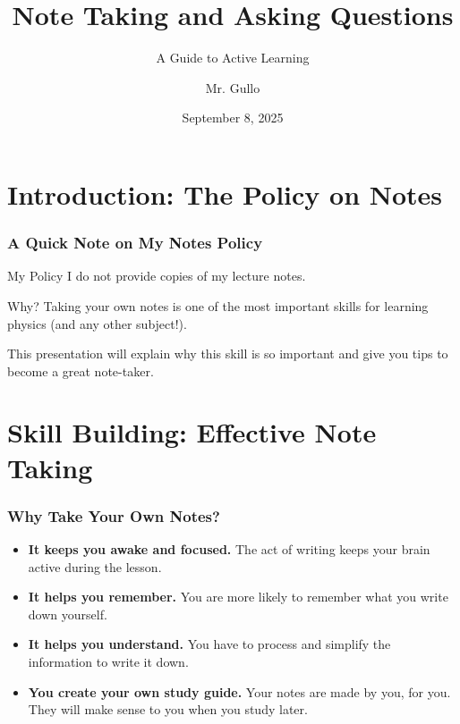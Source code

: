 \documentclass{beamer}
\title[Note Taking]{Note Taking and Asking Questions}
\subtitle{A Guide to Active Learning}
\author[Mr. Gullo]{Mr. Gullo}
\date[Sep 8, 2025]{September 8, 2025}
\begin{document}
\frame{\titlepage}

\section{Introduction: The Policy on Notes}

\begin{frame}
\frametitle{A Quick Note on My Notes Policy}
\begin{block}{My Policy}
    I do not provide copies of my lecture notes.
\end{block}

\begin{block}{Why?}
    Taking your own notes is one of the most important skills for learning physics (and any other subject!).
    \vspace{1cm}

    This presentation will explain why this skill is so important and give you tips to become a great note-taker.
\end{block}
\end{frame}

\section{Skill Building: Effective Note Taking}

\begin{frame}
\frametitle{Why Take Your Own Notes?}
\begin{itemize}
    \item \textbf{It keeps you awake and focused.} The act of writing keeps your brain active during the lesson.
    \pause
    \item \textbf{It helps you remember.} You are more likely to remember what you write down yourself.
    \pause
    \item \textbf{It helps you understand.} You have to process and simplify the information to write it down.
    \pause
    \item \textbf{You create your own study guide.} Your notes are made by you, for you. They will make sense to you when you study later.
\end{itemize}
\vfill

\end{frame}
\end{document}
